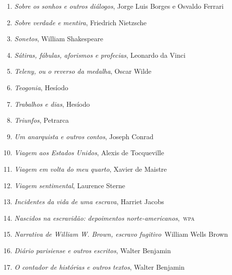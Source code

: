 \begin{enumerate}
\item \textit{Sobre os sonhos e outros diálogos}, Jorge Luis Borges e Osvaldo Ferrari
\item \textit{Sobre verdade e mentira}, Friedrich Nietzsche
\item \textit{Sonetos}, William Shakespeare
\item \textit{Sátiras, fábulas, aforismos e profecias}, Leonardo da Vinci
\item \textit{Teleny, ou o reverso da medalha}, Oscar Wilde
\item \textit{Teogonia}, Hesíodo
\item \textit{Trabalhos e dias}, Hesíodo
\item \textit{Triunfos}, Petrarca
\item \textit{Um anarquista e outros contos}, Joseph Conrad
\item \textit{Viagem aos Estados Unidos}, Alexis de Tocqueville
\item \textit{Viagem em volta do meu quarto}, Xavier de Maistre 
\item \textit{Viagem sentimental}, Laurence Sterne
\item \textit{Incidentes da vida de uma escrava}, Harriet Jacobs
\item \textit{Nascidos na escravidão: depoimentos norte-americanos},\, \textsc{wpa}
\item \textit{Narrativa de William W. Brown, escravo fugitivo}\, William Wells Brown
\item \textit{Diário parisiense e outros escritos}, Walter Benjamin
\item \textit{O contador de histórias e outros textos}, Walter Benjamin
\end{enumerate}

\vspace{-5mm}


\vspace{-5mm}

